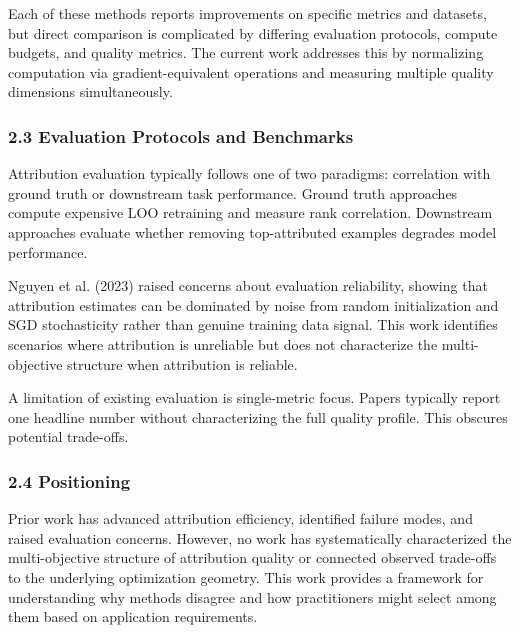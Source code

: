 Each of these methods reports improvements on specific metrics and datasets, but direct comparison is complicated by differing evaluation protocols, compute budgets, and quality metrics. The current work addresses this by normalizing computation via gradient-equivalent operations and measuring multiple quality dimensions simultaneously.

\subsubsection{2.3 Evaluation Protocols and Benchmarks}

Attribution evaluation typically follows one of two paradigms: correlation with ground truth or downstream task performance. Ground truth approaches compute expensive LOO retraining and measure rank correlation. Downstream approaches evaluate whether removing top-attributed examples degrades model performance.

Nguyen et al. (2023) raised concerns about evaluation reliability, showing that attribution estimates can be dominated by noise from random initialization and SGD stochasticity rather than genuine training data signal. This work identifies scenarios where attribution is unreliable but does not characterize the multi-objective structure when attribution is reliable.

A limitation of existing evaluation is single-metric focus. Papers typically report one headline number without characterizing the full quality profile. This obscures potential trade-offs.

\subsubsection{2.4 Positioning}

Prior work has advanced attribution efficiency, identified failure modes, and raised evaluation concerns. However, no work has systematically characterized the multi-objective structure of attribution quality or connected observed trade-offs to the underlying optimization geometry. This work provides a framework for understanding why methods disagree and how practitioners might select among them based on application requirements.
